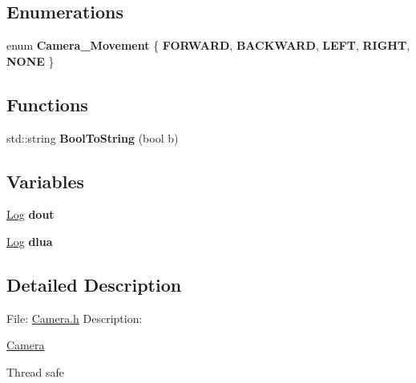 \subsection*{Enumerations}
\begin{DoxyCompactItemize}
\item 
\mbox{\label{namespacedarksun_ac3cc208e63c281a8f919d306bd5c0872}} 
enum {\bfseries Camera\+\_\+\+Movement} \{ \newline
{\bfseries F\+O\+R\+W\+A\+RD}, 
{\bfseries B\+A\+C\+K\+W\+A\+RD}, 
{\bfseries L\+E\+FT}, 
{\bfseries R\+I\+G\+HT}, 
\newline
{\bfseries N\+O\+NE}
 \}
\end{DoxyCompactItemize}
\subsection*{Functions}
\begin{DoxyCompactItemize}
\item 
\mbox{\label{namespacedarksun_a9a055483728123086e1397f456d0610d}} 
std\+::string {\bfseries Bool\+To\+String} (bool b)
\end{DoxyCompactItemize}
\subsection*{Variables}
\begin{DoxyCompactItemize}
\item 
\mbox{\label{namespacedarksun_a446f7dddff99a23bf3cb07fd9c28f83a}} 
\mbox{\hyperlink{classdarksun_1_1_log}{Log}} {\bfseries dout}
\item 
\mbox{\label{namespacedarksun_a8c5fc49ebba2976f2eeec5920dffb606}} 
\mbox{\hyperlink{classdarksun_1_1_log}{Log}} {\bfseries dlua}
\end{DoxyCompactItemize}


\subsection{Detailed Description}
File\+: \mbox{\hyperlink{_camera_8h_source}{Camera.\+h}} Description\+:

\mbox{\hyperlink{classdarksun_1_1_camera}{Camera}}

Thread safe

